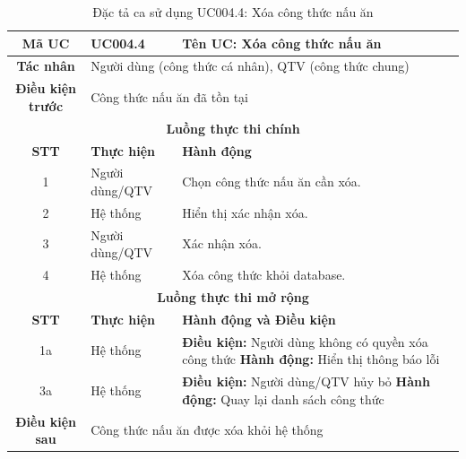 \begin{table}[H]
    \centering
    \label{tab:uc004-4}
    \begin{tabularx}{\textwidth}{|c|p{3.5cm}|X|}
        \hline
        \rowcolor{headergreen} 
        \textbf{Mã UC} & \textbf{UC004.4} & \textbf{Tên UC: Xóa công thức nấu ăn} \\ \hline
        \textbf{Tác nhân} & \multicolumn{2}{X|}{Người dùng (công thức cá nhân), QTV (công thức chung)} \\ \hline
        \textbf{Điều kiện trước} & \multicolumn{2}{X|}{Công thức nấu ăn đã tồn tại} \\ \hline
        
        \multicolumn{3}{|c|}{\cellcolor{headerorange}\textbf{Luồng thực thi chính}} \\ \hline
        \rowcolor{graybg} \textbf{STT} & \textbf{Thực hiện} & \textbf{Hành động} \\ \hline
        1 & Người dùng/QTV & Chọn công thức nấu ăn cần xóa. \\ \hline
        2 & Hệ thống & Hiển thị xác nhận xóa. \\ \hline
        3 & Người dùng/QTV & Xác nhận xóa. \\ \hline
        4 & Hệ thống & Xóa công thức khỏi database. \\ \hline
        
        \multicolumn{3}{|c|}{\cellcolor{headerorange}\textbf{Luồng thực thi mở rộng}} \\ \hline
        \rowcolor{graybg} \textbf{STT} & \textbf{Thực hiện} & \textbf{Hành động và Điều kiện} \\ \hline
        1a & Hệ thống & \textbf{Điều kiện:} Người dùng không có quyền xóa công thức \newline \textbf{Hành động:} Hiển thị thông báo lỗi \\ \hline
        3a & Hệ thống & \textbf{Điều kiện:} Người dùng/QTV hủy bỏ \newline \textbf{Hành động:} Quay lại danh sách công thức \\ \hline
        
        \textbf{Điều kiện sau} & \multicolumn{2}{X|}{Công thức nấu ăn được xóa khỏi hệ thống} \\ \hline
    \end{tabularx}
    \caption{Đặc tả ca sử dụng UC004.4: Xóa công thức nấu ăn}
\end{table}

